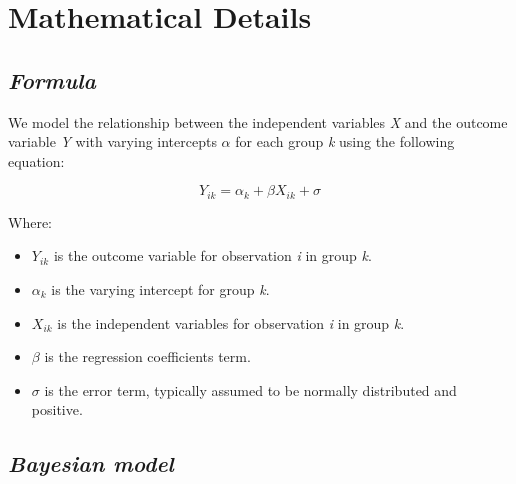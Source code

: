 \documentclass[
  letterpaper,
  DIV=11,
  numbers=noendperiod]{scrreprt}
\newenvironment{Shaded}{\begin{snugshade}}{\end{snugshade}}
\newcommand{\CommentTok}[1]{\textcolor[rgb]{0.37,0.37,0.37}{#1}}
\newcommand{\FloatTok}[1]{\textcolor[rgb]{0.68,0.00,0.00}{#1}}
\newcommand{\FunctionTok}[1]{\textcolor[rgb]{0.28,0.35,0.67}{#1}}
\newcommand{\NormalTok}[1]{\textcolor[rgb]{0.00,0.23,0.31}{#1}}
\newcommand{\SpecialCharTok}[1]{\textcolor[rgb]{0.37,0.37,0.37}{#1}}
\begin{document}
\begin{Shaded}
\end{Shaded}

\section{Mathematical Details}\label{mathematical-details-11}

\subsection{\texorpdfstring{\emph{Formula}}{Formula}}\label{formula-4}

We model the relationship between the independent variables \emph{X} and
the outcome variable \emph{Y} with varying intercepts \(\alpha\) for
each group \emph{k} using the following equation:

\[
Y_{ik} = \alpha_k + \beta X_{ik} + \sigma
\]

Where:

\begin{itemize}
\item
  \(Y_{ik}\) is the outcome variable for observation \emph{i} in group
  \emph{k}.
\item
  \(\alpha_k\) is the varying intercept for group \emph{k}.
\item
  \(X_{ik}\) is the independent variables for observation \emph{i} in
  group \emph{k}.
\item
  \(\beta\) is the regression coefficients term.
\item
  \(\sigma\) is the error term, typically assumed to be normally
  distributed and positive.
\end{itemize}

\subsection{\texorpdfstring{\emph{Bayesian
model}}{Bayesian model}}\label{bayesian-model-4}
\end{document}
